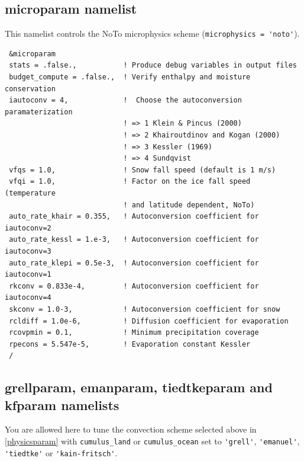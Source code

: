 \subsection{microparam namelist}

This namelist controls the NoTo microphysics scheme
(\verb|microphysics = 'noto'|).

{\footnotesize
\begin{Verbatim}
 &microparam
 stats = .false.,           ! Produce debug variables in output files
 budget_compute = .false.,  ! Verify enthalpy and moisture conservation
 iautoconv = 4,             !  Choose the autoconversion paramaterization
                            ! => 1 Klein & Pincus (2000)
                            ! => 2 Khairoutdinov and Kogan (2000)
                            ! => 3 Kessler (1969)
                            ! => 4 Sundqvist
 vfqs = 1.0,                ! Snow fall speed (default is 1 m/s)
 vfqi = 1.0,                ! Factor on the ice fall speed (temperature
                            ! and latitude dependent, NoTo)
 auto_rate_khair = 0.355,   ! Autoconversion coefficient for iautoconv=2
 auto_rate_kessl = 1.e-3,   ! Autoconversion coefficient for iautoconv=3
 auto_rate_klepi = 0.5e-3,  ! Autoconversion coefficient for iautoconv=1
 rkconv = 0.833e-4,         ! Autoconversion coefficient for iautoconv=4
 skconv = 1.0-3,            ! Autoconversion coefficient for snow
 rcldiff = 1.0e-6,          ! Diffusion coefficient for evaporation
 rcovpmin = 0.1,            ! Minimum precipitation coverage
 rpecons = 5.547e-5,        ! Evaporation constant Kessler
 /
\end{Verbatim}
}

\subsection{grellparam, emanparam, tiedtkeparam and kfparam namelists}

You are allowed here to tune the convection scheme selected above in
\ref{physicsparam} with \verb=cumulus_land= or \verb=cumulus_ocean= set
to \verb='grell'=, \verb='emanuel'=, \verb='tiedtke'= or
\verb='kain-fritsch'=.

